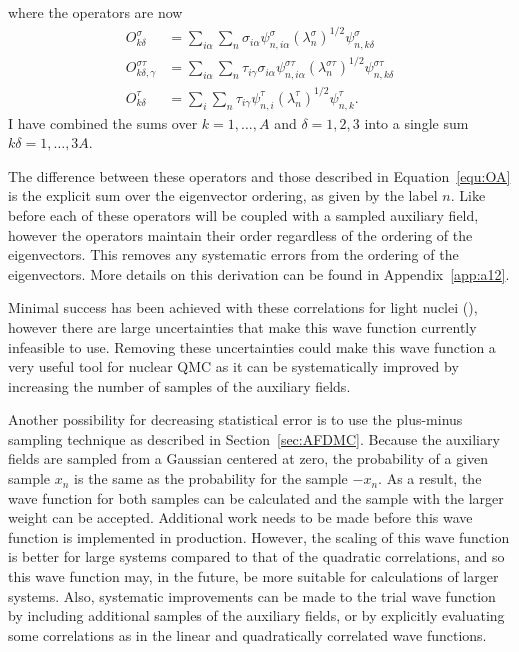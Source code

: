 where the operators are now
\begin{equation}
\begin{split}
   O_{k\delta}^{\sigma} &= \sum\limits_{i\alpha}\sum\limits_n \sigma_{i\alpha}\psi_{n,i\alpha}^\sigma\left(\lambda_n^\sigma\right)^{1/2}\psi_{n,k\delta}^{\sigma} \\
   O_{k\delta,\gamma}^{\sigma\tau} &= \sum\limits_{i\alpha}\sum\limits_n \tau_{i\gamma}\sigma_{i\alpha}\psi_{n,i\alpha}^{\sigma\tau}\left(\lambda_n^{\sigma\tau}\right)^{1/2}\psi_{n,k\delta}^{\sigma\tau} \\
   O_{k\delta}^{\tau} &= \sum\limits_{i}\sum\limits_n \tau_{i\gamma}\psi_{n,i}^\tau\left(\lambda_n^\tau\right)^{1/2}\psi_{n,k}^{\tau}.
\end{split}
\end{equation}
I have combined the sums over $k=1,\ldots,A$ and $\delta=1,2,3$ into a single sum $k\delta=1,\ldots,3A$.

The difference between these operators and those described in Equation~\ref{equ:OA} is the explicit sum over the eigenvector ordering, as given by the label $n$. Like before each of these operators will be coupled with a sampled auxiliary field, however the operators maintain their order regardless of the ordering of the eigenvectors. This removes any systematic errors from the ordering of the eigenvectors. More details on this derivation can be found in Appendix~\ref{app:a12}.

Minimal success has been achieved with these correlations for light nuclei (\cite{bouadani2009_dissertation}), however there are large uncertainties that make this wave function currently infeasible to use. Removing these uncertainties could make this wave function a very useful tool for nuclear QMC as it can be systematically improved by increasing the number of samples of the auxiliary fields.

Another possibility for decreasing statistical error is to use the plus-minus sampling technique as described in Section~\ref{sec:AFDMC}. Because the auxiliary fields are sampled from a Gaussian centered at zero, the probability of a given sample $x_n$ is the same as the probability for the sample $-x_n$. As a result, the wave function for both samples can be calculated and the sample with the larger weight can be accepted. Additional work needs to be made before this wave function is implemented in production. However, the scaling of this wave function is better for large systems compared to that of the quadratic correlations, and so this wave function may, in the future, be more suitable for calculations of larger systems. Also, systematic improvements can be made to the trial wave function by including additional samples of the auxiliary fields, or by explicitly evaluating some correlations as in the linear and quadratically correlated wave functions.

